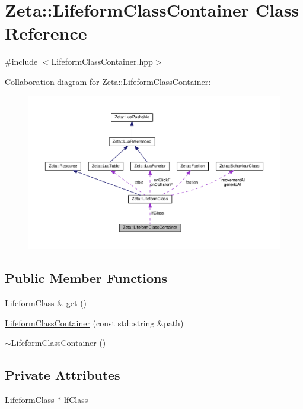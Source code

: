 \hypertarget{classZeta_1_1LifeformClassContainer}{\section{Zeta\+:\+:Lifeform\+Class\+Container Class Reference}
\label{classZeta_1_1LifeformClassContainer}
}


{\ttfamily \#include $<$Lifeform\+Class\+Container.\+hpp$>$}



Collaboration diagram for Zeta\+:\+:Lifeform\+Class\+Container\+:\nopagebreak
\begin{figure}[H]
\begin{center}
\leavevmode
\includegraphics[width=350pt]{classZeta_1_1LifeformClassContainer__coll__graph}
\end{center}
\end{figure}
\subsection*{Public Member Functions}
\begin{DoxyCompactItemize}
\item 
\hyperlink{classZeta_1_1LifeformClass}{Lifeform\+Class} \& \hyperlink{classZeta_1_1LifeformClassContainer_a3dbdb2435d11a3dd680ac6f52f9d976b}{get} ()
\item 
\hyperlink{classZeta_1_1LifeformClassContainer_abd3e4168721a06d89c739510c9ce8078}{Lifeform\+Class\+Container} (const std\+::string \&path)
\item 
\hyperlink{classZeta_1_1LifeformClassContainer_a014729315ed7b99f23b2456b5509825e}{$\sim$\+Lifeform\+Class\+Container} ()
\end{DoxyCompactItemize}
\subsection*{Private Attributes}
\begin{DoxyCompactItemize}
\item 
\hyperlink{classZeta_1_1LifeformClass}{Lifeform\+Class} $\ast$ \hyperlink{classZeta_1_1LifeformClassContainer_a462b408a813cc5532d40214058afc059}{lf\+Class}
\end{DoxyCompactItemize}


